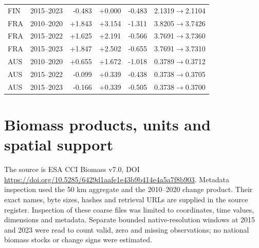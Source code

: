 \documentclass[11pt,a4paper]{article}
\begin{document}
\begin{table}[htbp]
\begin{tabularx}{\textwidth}{llrrrX}
FIN & 2015--2023 & -0.483 & +0.000 & -0.483 & 2.1319$\rightarrow$2.1104\\
FRA & 2010--2020 & +1.843 & +3.154 & -1.311 & 3.8205$\rightarrow$3.7426\\
FRA & 2015--2022 & +1.625 & +2.191 & -0.566 & 3.7691$\rightarrow$3.7360\\
FRA & 2015--2023 & +1.847 & +2.502 & -0.655 & 3.7691$\rightarrow$3.7310\\
AUS & 2010--2020 & +0.655 & +1.672 & -1.018 & 0.3789$\rightarrow$0.3712\\
AUS & 2015--2022 & -0.099 & +0.339 & -0.438 & 0.3738$\rightarrow$0.3705\\
AUS & 2015--2023 & -0.166 & +0.339 & -0.505 & 0.3738$\rightarrow$0.3700\\
\bottomrule\end{tabularx}
\end{table}

\section{Biomass products, units and spatial support}

The source is ESA CCI Biomass v7.0, DOI \url{https://doi.org/10.5285/6429d1aafe1e43b9b414e4a5a7f8b903}. Metadata inspection used the 50 km aggregate and the 2010--2020 change product. Their exact names, byte sizes, hashes and retrieval URLs are supplied in the source register. Inspection of these coarse files was limited to coordinates, time values, dimensions and metadata. Separate bounded native-resolution windows at 2015 and 2023 were read to count valid, zero and missing observations; no national biomass stocks or change signs were estimated.
\end{document}
